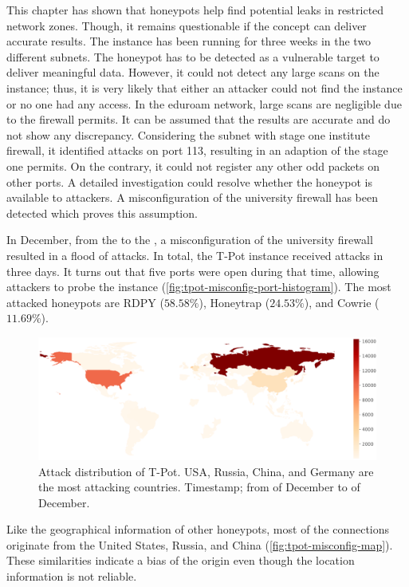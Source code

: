 This chapter has shown that honeypots help find potential leaks in restricted network zones.
Though, it remains questionable if the concept can deliver accurate results.
The instance has been running for three weeks in the two different subnets.
The honeypot has to be detected as a vulnerable target to deliver meaningful data.
However, it could not detect any large scans on the instance; thus, it is very likely that either an attacker could not find the instance or no one had any access.
In the eduroam network, large scans are negligible due to the firewall permits.
It can be assumed that the results are accurate and do not show any discrepancy.
Considering the subnet with stage one institute firewall, it identified attacks on port 113, resulting in an adaption of the stage one permits.
On the contrary, it could not register any other odd packets on other ports.
A detailed investigation could resolve whether the honeypot is available to attackers.
A misconfiguration of the university firewall has been detected which proves this assumption.

In December, from the  to the , a misconfiguration of the university firewall resulted in a flood of attacks.
In total, the T-Pot instance received  attacks in three days.
It turns out that five ports were open during that time, allowing attackers to probe the instance (\autoref{fig:tpot-misconfig-port-histogram}).
The most attacked honeypots are RDPY ($58.58\%$), Honeytrap ($24.53\%$), and Cowrie ($11.69\%$).

\begin{figure}[htbp]
    \centering
    \includegraphics[width=\textwidth]{figures/tpot-misconfig-overview-map.pdf}
    \caption[Attack distribution of T-Pot]{
        Attack distribution of T-Pot.
        USA, Russia, China, and Germany are the most attacking countries.
        Timestamp; from  of December to  of December.
    }
    \label{fig:tpot-misconfig-map}
\end{figure}

Like the geographical information of other honeypots, most of the connections originate from the United States, Russia, and China (\autoref{fig:tpot-misconfig-map}).
These similarities indicate a bias of the origin even though the location information is not reliable.

